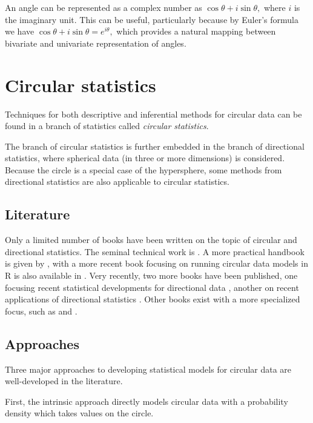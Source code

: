 \documentclass[12pt, a4paper]{book}\usepackage[]{graphicx}\usepackage[]{color}
\begin{document}
An angle can be represented as a complex number as $\cos\theta + i \sin \theta,$ where $i$ is the imaginary unit. This can be useful, particularly because by Euler's formula we have $\cos\theta + i \sin \theta = e^{i\theta},$ which provides a natural mapping between bivariate and univariate representation of angles.




\section{Circular statistics}

Techniques for both descriptive and inferential methods for circular data can be found in a branch of statistics called \textit{circular statistics}.

The branch of circular statistics is further embedded in the branch of directional statistics, where spherical data (in three or more dimensions) is considered. Because the circle is a special case of the hypersphere, some methods from directional statistics are also applicable to circular statistics.

\subsection{Literature}

Only a limited number of books have been written on the topic of circular and directional statistics. The seminal technical work is \citet{mardia2009directional}. A more practical handbook is given by \citet{fisher1995statistical}, with a more recent book focusing on running circular data models in R is also available in \citet{pewsey2013circular}. Very recently, two more books have been published, one focusing recent statistical developments for directional data \citep{ley2017modern}, another on recent applications of directional statistics \citep{ley2018applied}. Other books exist with a more specialized focus, such as \citet{batschelet1981circular} and \citet{jammalamadaka2001topics}.

\subsection{Approaches}

Three major approaches to developing statistical models for circular data are well-developed in the literature.

First, the intrinsic approach directly models circular data with a probability density which takes values on the circle.
\end{document}
